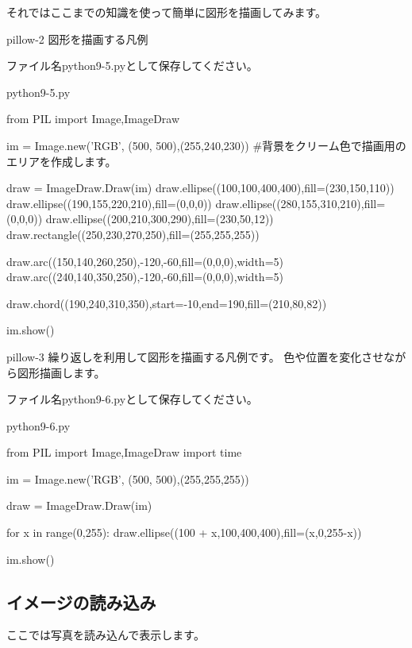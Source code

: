 \documentclass[11pt,a4paper,dvipdfmx,titlepage]{jsreport}
\begin{document}
それではここまでの知識を使って簡単に図形を描画してみます。

\begin{pabox}{pillow-2}
図形を描画する凡例

ファイル名python9-5.pyとして保存してください。
\begin{codebox}{python9-5.py}
\begin{listing}{1}
from PIL import Image,ImageDraw

im = Image.new('RGB', (500, 500),(255,240,230))
#背景をクリーム色で描画用のエリアを作成します。

draw = ImageDraw.Draw(im)
draw.ellipse((100,100,400,400),fill=(230,150,110))
draw.ellipse((190,155,220,210),fill=(0,0,0))
draw.ellipse((280,155,310,210),fill=(0,0,0))
draw.ellipse((200,210,300,290),fill=(230,50,12))
draw.rectangle((250,230,270,250),fill=(255,255,255))

draw.arc((150,140,260,250),-120,-60,fill=(0,0,0),width=5)
draw.arc((240,140,350,250),-120,-60,fill=(0,0,0),width=5)

draw.chord((190,240,310,350),start=-10,end=190,fill=(210,80,82))

im.show()

\end{listing}
\end{codebox}
\end{pabox}

\begin{pabox}{pillow-3}
繰り返しを利用して図形を描画する凡例です。
色や位置を変化させながら図形描画します。

ファイル名python9-6.pyとして保存してください。
\begin{codebox}{python9-6.py}
\begin{listing}{1}
from PIL import Image,ImageDraw
import time

im = Image.new('RGB', (500, 500),(255,255,255))

draw = ImageDraw.Draw(im)

for x in range(0,255):
    draw.ellipse((100 + x,100,400,400),fill=(x,0,255-x))  

im.show()
\end{listing}
\end{codebox}
\end{pabox}

\subsection{イメージの読み込み}
ここでは写真を読み込んで表示します。
\end{document}
